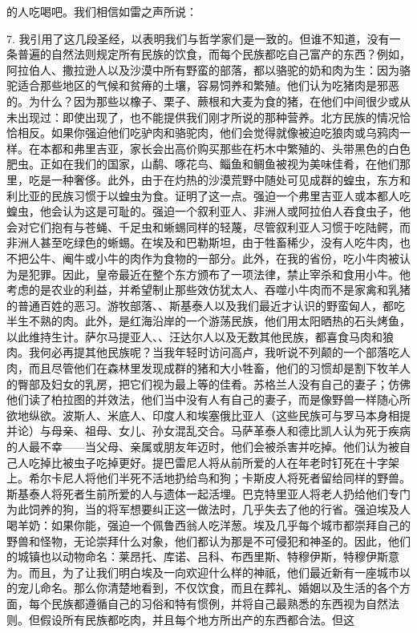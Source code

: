 的人吃喝吧。我们相信如雷之声所说：\par

7. 我引用了这几段圣经，以表明我们与哲学家们是一致的。但谁不知道，没有一条普遍的自然法则规定所有民族的饮食，而每个民族都吃自己富产的东西？例如，阿拉伯人、撒拉逊人以及沙漠中所有野蛮的部落，都以骆驼的奶和肉为生：因为骆驼适合那些地区的气候和贫瘠的土壤，容易饲养和繁殖。他们认为吃猪肉是邪恶的。为什么？因为那些以橡子、栗子、蕨根和大麦为食的猪，在他们中间很少或从未出现过：即使出现了，也不能提供我们刚才所说的那种营养。北方民族的情况恰恰相反。如果你强迫他们吃驴肉和骆驼肉，他们会觉得就像被迫吃狼肉或乌鸦肉一样。在本都和弗里吉亚，家长会出高价购买那些在朽木中繁殖的、头带黑色的白色肥虫。正如在我们的国家，山鹬、啄花鸟、鲻鱼和鲷鱼被视为美味佳肴，在他们那里，吃是一种奢侈。此外，由于在灼热的沙漠荒野中随处可见成群的蝗虫，东方和利比亚的民族习惯于以蝗虫为食。证明了这一点。强迫一个弗里吉亚人或本都人吃蝗虫，他会认为这是可耻的。强迫一个叙利亚人、非洲人或阿拉伯人吞食虫子，他会对它们抱有与苍蝇、千足虫和蜥蜴同样的轻蔑，尽管叙利亚人习惯于吃陆鳄，而非洲人甚至吃绿色的蜥蜴。在埃及和巴勒斯坦，由于牲畜稀少，没有人吃牛肉，也不把公牛、阉牛或小牛的肉作为食物的一部分。此外，在我的省份，吃小牛肉被认为是犯罪。因此，皇帝最近在整个东方颁布了一项法律，禁止宰杀和食用小牛。他考虑的是农业的利益，并希望制止那些效仿犹太人、吞噬小牛肉而不是家禽和乳猪的普通百姓的恶习。游牧部落、、斯基泰人以及我们最近才认识的野蛮匈人，都吃半生不熟的肉。此外，是红海沿岸的一个游荡民族，他们用太阳晒热的石头烤鱼，以此维持生计。萨尔马提亚人、、汪达尔人以及无数其他民族，都喜食马肉和狼肉。我何必再提其他民族呢？当我年轻时访问高卢，我听说不列颠的一个部落吃人肉，而且尽管他们在森林里发现成群的猪和大小牲畜，他们的习惯却是割下牧羊人的臀部及妇女的乳房，把它们视为最上等的佳肴。苏格兰人没有自己的妻子；仿佛他们读了柏拉图的并效法，他们当中没有人有自己的妻子，而是像野兽一样随心所欲地纵欲。波斯人、米底人、印度人和埃塞俄比亚人（这些民族可与罗马本身相提并论）与母亲、祖母、女儿、孙女混乱交合。马萨革泰人和德比凯人认为死于疾病的人最不幸——当父母、亲属或朋友年迈时，他们会被杀害并吃掉。他们认为被自己人吃掉比被虫子吃掉更好。提巴雷尼人将从前所爱的人在年老时钉死在十字架上。希尔卡尼人将他们半死不活地扔给鸟和狗；卡斯皮人将死者留给同样的野兽。斯基泰人将死者生前所爱的人与遗体一起活埋。巴克特里亚人将老人扔给他们专门为此饲养的狗，当的将军想要纠正这一做法时，几乎失去了他的行省。强迫埃及人喝羊奶：如果你能，强迫一个佩鲁西翁人吃洋葱。埃及几乎每个城市都崇拜自己的野兽和怪物，无论崇拜什么对象，他们都认为那是不可侵犯和神圣的。因此，他们的城镇也以动物命名：莱昂托、库诺、吕科、布西里斯、特穆伊斯，特穆伊斯意为。而且，为了让我们明白埃及一向欢迎什么样的神祇，他们最近新有一座城市以的宠儿命名。那么你清楚地看到，不仅饮食，而且在葬礼、婚姻以及生活的各个方面，每个民族都遵循自己的习俗和特有惯例，并将自己最熟悉的东西视为自然法则。但假设所有民族都吃肉，并且每个地方所出产的东西都合法。但这